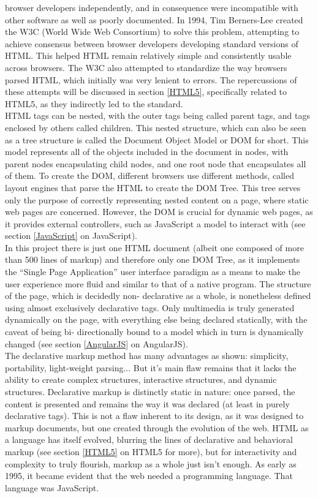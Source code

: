 browser developers independently, and in consequence were incompatible with other software as well as poorly
documented. In 1994, Tim Berners-Lee created the W3C (World Wide Web Consortium) to solve this problem, attempting to
achieve consensus between browser developers developing standard versions of HTML. This helped HTML remain relatively
simple and consistently usable across browsers. The W3C also attempted to standardize the way browsers parsed HTML,
which initially was very lenient to errors. The repercussions of these attempts will be discussed in section
\ref{HTML5}, specifically related to HTML5, as they indirectly led to the standard.\\

HTML tags can be nested, with the outer tags being called parent tags, and tags enclosed by others called children.
This nested structure, which can also be seen as a tree structure is called the Document Object Model or DOM for short.
This model represents all of the objects included in the document in nodes, with parent nodes encapsulating child nodes,
and one root node that encapsulates all of them. To create the DOM, different browsers use different methods, called
layout engines that parse the HTML to create the DOM Tree. This tree serves only the purpose of correctly representing
nested content on a page, where static web pages are concerned. However, the DOM is crucial for dynamic web pages, as it
provides external controllers, such as JavaScript a model to interact with (see section \ref{JavaScript} on JavaScript).\\

In this project there is just one HTML document (albeit one composed of more than 500 lines of markup) and therefore only
one DOM Tree, as it implements the ``Single Page Application'' user interface paradigm as a means to make the user
experience more fluid and similar to that of a native program. The structure of the page, which is decidedly non-
declarative as a whole, is nonetheless defined using almost exclusively declarative tags. Only multimedia is truly
generated dynamically on the page, with everything else being declared statically, with the caveat of being bi-
directionally bound to a model which in turn is dynamically changed (see section \ref{AngularJS} on AngularJS).\\

The declarative markup method has many advantages as shown: simplicity, portability, light-weight parsing... But it's
main flaw remains that it lacks the ability to create complex structures, interactive structures, and dynamic
structures. Declarative markup is distinctly static in nature: once parsed, the content is presented and remains the
way it was declared (at least in purely declarative tags). This is not a flaw inherent to its design, as it was designed
to markup documents, but one created through the evolution of the web. HTML as a language has itself evolved, blurring
the lines of declarative and behavioral markup (see section \ref{HTML5} on HTML5 for more), but for interactivity and
complexity to truly flourish, markup as a whole just isn't enough. As early as 1995, it became evident that the web
needed a programming language. That language was JavaScript.
